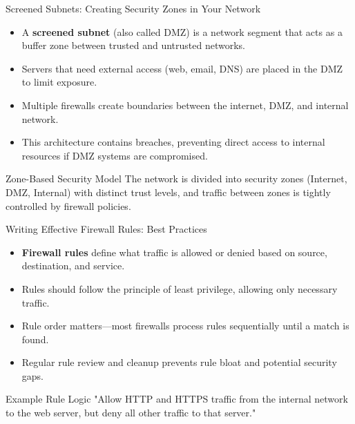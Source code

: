 \documentclass{beamer}
\begin{document}
\begin{frame}{Screened Subnets: Creating Security Zones in Your Network}
\begin{itemize}
\item A \textbf{screened subnet} (also called DMZ) is a network segment that acts as a buffer zone between trusted and untrusted networks.
\item Servers that need external access (web, email, DNS) are placed in the DMZ to limit exposure.
\item Multiple firewalls create boundaries between the internet, DMZ, and internal network.
\item This architecture contains breaches, preventing direct access to internal resources if DMZ systems are compromised.
\end{itemize}

\begin{block}{Zone-Based Security Model}
The network is divided into security zones (Internet, DMZ, Internal) with distinct trust levels, and traffic between zones is tightly controlled by firewall policies.
\end{block}
\end{frame}

\begin{frame}{Writing Effective Firewall Rules: Best Practices}
\begin{itemize}
\item \textbf{Firewall rules} define what traffic is allowed or denied based on source, destination, and service.
\item Rules should follow the principle of least privilege, allowing only necessary traffic.
\item Rule order matters—most firewalls process rules sequentially until a match is found.
\item Regular rule review and cleanup prevents rule bloat and potential security gaps.
\end{itemize}

\begin{exampleblock}{Example Rule Logic}
"Allow HTTP and HTTPS traffic from the internal network to the web server, but deny all other traffic to that server."
\end{exampleblock}
\end{frame}
\end{document}

